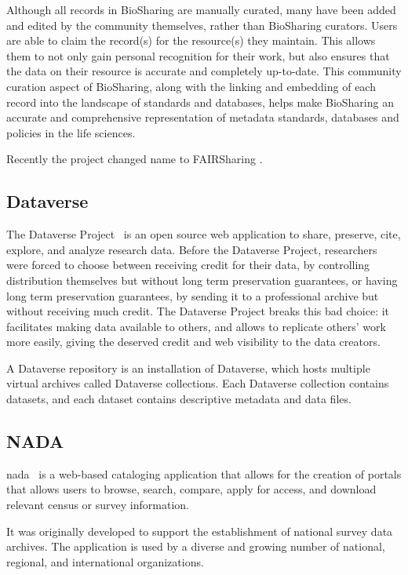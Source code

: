 Although all records in BioSharing are manually curated, many have been added and
edited by the community themselves, rather than BioSharing curators.
Users are able to claim the record(s) for the resource(s) they maintain.
This allows them to not only gain personal recognition for their work, but also ensures
that the data on their resource is accurate and completely up-to-date.
This community curation aspect of BioSharing, along with the linking and embedding of
each record into the landscape of standards and databases, helps make BioSharing an
accurate and comprehensive representation of metadata standards, databases and policies
in the life sciences.

Recently the project changed name to FAIRSharing \cite{fairsharing}.

\subsection*{Dataverse}
The Dataverse Project~\cite{dataverse} is an open source web application to share, preserve, cite, explore, and analyze research data.
Before the Dataverse Project, researchers were forced to choose between receiving credit for their data, by controlling distribution themselves but without long term preservation guarantees, or having long term preservation guarantees, by sending it to a professional archive but without receiving much credit.
The Dataverse Project breaks this bad choice: it facilitates making data available to others, and allows to replicate others' work more easily, giving the deserved credit and web visibility to the data creators.

A Dataverse repository is an installation of Dataverse, which hosts multiple virtual archives called Dataverse collections.
Each Dataverse collection contains datasets, and each dataset contains descriptive metadata and data files.


\subsection*{NADA}
\gls{nada}~\cite{nada} is a web-based cataloging application that allows for the creation of portals that allows users to browse, search, compare, apply for access, and download relevant census or survey information.

It was originally developed to support the establishment of national survey data archives.
The application is used by a diverse and growing number of national, regional, and international organizations.

